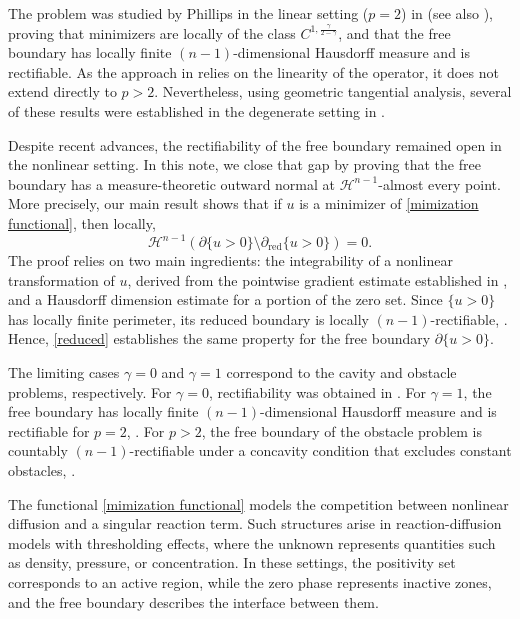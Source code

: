 \documentclass[11pt, reqno]{amsart}
\numberwithin{equation}{section}
\numberwithin{theorem}{section}
\numberwithin{lemma}{section}
\numberwithin{corollary}{section}
\numberwithin{remark}{section}
\numberwithin{proposition}{section}
\numberwithin{definition}{section}
\def \H {\mathcal{H}^{n-1}}
\newcommand{\reduced}{\operatorname{red}}
\begin{document}
The problem was studied by Phillips in the linear setting ($p=2$) in \cite{P83,Ph83} (see also \cite{AP86,AT13}), proving that minimizers are locally of the class $C^{1,\frac{\gamma}{2-\gamma}}$, and that the free boundary has locally finite $(n-1)$-dimensional Hausdorff measure and is rectifiable. As the approach in \cite{P83,Ph83} relies on the linearity of the operator, it does not extend directly to $p>2$. Nevertheless, using geometric tangential analysis, several of these results were established in the degenerate setting in \cite{ATV23,ATU25}.

Despite recent advances, the rectifiability of the free boundary remained open in the nonlinear setting. In this note, we close that gap by proving that the free boundary has a measure-theoretic outward normal at $\H$-almost every point. More precisely, our main result shows that if $u$ is a minimizer of \eqref{mimization functional}, then locally,
\begin{equation}\label{reduced}
    \H(\partial\{u>0\}\setminus\partial_{\reduced}\{u>0\})=0.
\end{equation}
The proof relies on two main ingredients: the integrability of a nonlinear transformation of $u$, derived from the pointwise gradient estimate established in \cite{ATU25}, and a Hausdorff dimension estimate for a portion of the zero set. Since $\{u>0\}$ has locally finite perimeter, its reduced boundary is locally $(n-1)$-rectifiable, \cite[Corollary 16.1]{M12}. Hence, \eqref{reduced} establishes the same property for the free boundary $\partial\{u>0\}$.

The limiting cases $\gamma=0$ and $\gamma=1$ correspond to the cavity and obstacle problems, respectively. For $\gamma=0$, rectifiability was obtained in \cite[Corollary 9.2]{DP05}. For $\gamma=1$, the free boundary has locally finite $(n-1)$-dimensional Hausdorff measure \cite{LS03,CLRT14} and is rectifiable for $p=2$, \cite{C98}. For $p>2$, the free boundary of the obstacle problem is countably $(n-1)$-rectifiable under a concavity condition that excludes constant obstacles, \cite[Theorem 1.8]{FKR17}.

\vspace{0.2 cm}

The functional \eqref{mimization functional} models the competition between nonlinear diffusion and a singular reaction term. Such structures arise in reaction-diffusion models with thresholding effects, where the unknown represents quantities such as density, pressure, or concentration. In these settings, the positivity set corresponds to an active region, while the zero phase represents inactive zones, and the free boundary describes the interface between them. 
\end{document}
